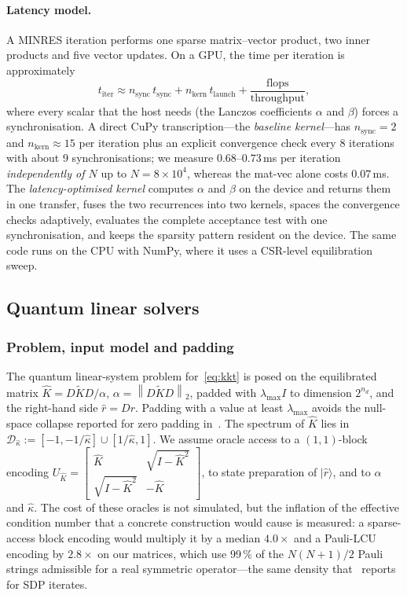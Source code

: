 \documentclass[11pt]{article}
\theoremstyle{definition}
\newcommand{\norm}[1]{\left\lVert #1 \right\rVert}
\newcommand{\Kt}{\tilde K}
\newcommand{\Kh}{\hat K}
\newcommand{\kh}{\hat\kappa}
\begin{document}
\paragraph{Latency model.}\label{sec:gpumodel}
A MINRES iteration performs one sparse matrix--vector product, two inner products and five vector updates. On a GPU, the time per iteration is approximately
\begin{equation}\label{eq:latency}
t_{\text{iter}} \approx n_{\text{sync}}\,t_{\text{sync}} + n_{\text{kern}}\,t_{\text{launch}} + \frac{\text{flops}}{\text{throughput}},
\end{equation}
where every scalar that the host needs (the Lanczos coefficients $\alpha$ and $\beta$) forces a synchronisation. A direct CuPy transcription---the \emph{baseline kernel}---has $n_{\text{sync}}=2$ and $n_{\text{kern}}\approx15$ per iteration plus an explicit convergence check every 8 iterations with about 9 synchronisations; we measure $0.68$--$0.73$\,ms per iteration \emph{independently of $N$} up to $N=8\times10^{4}$, whereas the mat-vec alone costs $0.07$\,ms. The \emph{latency-optimised kernel} computes $\alpha$ and $\beta$ on the device and returns them in one transfer, fuses the two recurrences into two kernels, spaces the convergence checks adaptively, evaluates the complete acceptance test with one synchronisation, and keeps the sparsity pattern resident on the device. The same code runs on the CPU with NumPy, where it uses a CSR-level equilibration sweep.

\subsection{Quantum linear solvers}\label{sec:qmath}
\subsubsection{Problem, input model and padding}
The quantum linear-system problem for~\eqref{eq:kkt} is posed on the equilibrated matrix $\Kh=D\Kt D/\alpha$, $\alpha=\norm{D\Kt D}_2$, padded with $\lambda_{\max}I$ to dimension $2^{n_d}$, and the right-hand side $\hat r=Dr$. Padding with a value at least $\lambda_{\max}$ avoids the null-space collapse reported for zero padding in~\cite{ozbaygin2026vqe}. The spectrum of $\Kh$ lies in $\mathcal D_{\kh}:=[-1,-1/\kh]\cup[1/\kh,1]$. We assume oracle access to a $(1,1)$-block encoding $U_{\Kh}=\begin{bmatrix}\Kh & \sqrt{I-\Kh^2}\\ \sqrt{I-\Kh^2} & -\Kh\end{bmatrix}$, to state preparation of $|\hat r\rangle$, and to $\alpha$ and $\kh$. The cost of these oracles is not simulated, but the inflation of the effective condition number that a concrete construction would cause is measured: a sparse-access block encoding would multiply it by a median $4.0\times$ and a Pauli-LCU encoding by $2.8\times$ on our matrices, which use 99\,\% of the $N(N+1)/2$ Pauli strings admissible for a real symmetric operator---the same density that~\cite{ozbaygin2026vqe} reports for SDP iterates.
\end{document}
